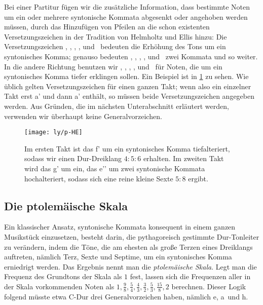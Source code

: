 Bei einer Partitur fügen wir die zusätzliche Information, dass bestimmte Noten
um ein oder mehrere syntonische Kommata abgesenkt oder angehoben werden müssen,
durch das Hinzufügen von Pfeilen an die schon existenten Versetzungszeichen in
der Tradition von Helmholtz und Ellis \cite{HE} hinzu: Die Versetzungszeichen
\dsharpp, \sharpp, \naturalp, \flatp, und \dflatp\ bedeuten die Erhöhung des
Tons um ein syntonisches Komma; genauso bedeuten \dsharppp, \sharppp,
\naturalpp, \flatpp, und \dflatpp\ zwei Kommata und so weiter. In die andere
Richtung benutzen wir \dsharpm, \sharpm, \naturalm, \flatm, und \dflatm\ für
Noten, die um ein syntonisches Komma tiefer erklingen sollen. Ein Beispiel ist
in \cref{fig:HE} zu sehen. Wie üblich gelten Versetzungszeichen für einen ganzen
Takt; wenn also ein einzelner Takt erst \naturalm a' und dann \natural a'
enthält, so müssen beide Versetzungszeichen angegeben werden. Aus Gründen, die
im nächsten Unterabschnitt erläutert werden, verwenden wir überhaupt keine
Generalvorzeichen.

\begin{figure}\centering
  \texttt{[image: ly/p-HE]}
  \caption{Im ersten Takt ist das \sharp f’ um ein syntonisches Komma
    tiefalteriert, sodass wir einen Dur-Dreiklang $4:5:6$ erhalten. Im zweiten
    Takt wird das g’ um ein, das \flat e’’ um zwei syntonische Kommata
    hochalteriert, sodass sich eine reine kleine Sexte $5:8$
    ergibt.}\label{fig:HE}
\end{figure}

\subsection{Die ptolemäische Skala}
\label{subsec:ptol}

Ein klassischer Ansatz, syntonische Kommata konsequent in einem
ganzen Musikstück einzusetzen, besteht darin, die pythagoreisch gestimmte
Dur-Tonleiter zu verändern, indem die Töne, die am ehesten als große Terzen
eines Dreiklangs auftreten, nämlich Terz, Sexte und Septime, um ein syntonisches
Komma erniedrigt werden. Das Ergebnis nennt man die \emph{ptolemäische
  Skala}. Legt man die Frequenz des Grundtons der Skala als $1$ fest, lassen
sich die Frequenzen aller in der Skala vorkommenden Noten als
$1,\frac98,\frac54,\frac43,\frac32,\frac53,\frac{15}8,2$ berechnen. Dieser Logik
folgend müsste etwa C-Dur drei Generalvorzeichen haben, nämlich \naturalm e,
\naturalm a\ und \naturalm h.

